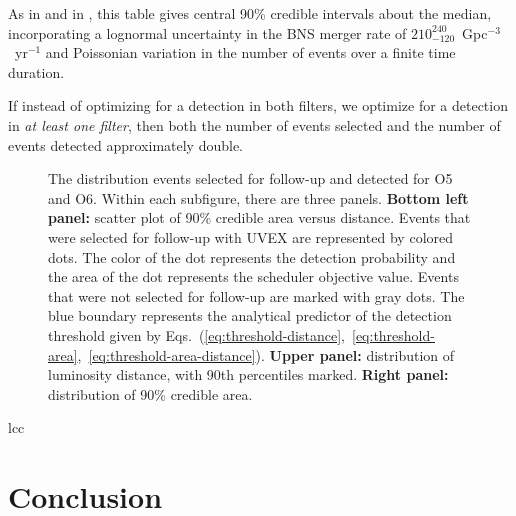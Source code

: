 \documentclass[twocolumn,times]{aastex631}
\begin{document}
As in \citet{2022ApJ...924...54P} and in \citet{2023ApJ...958..158K}, this table gives central 90\% credible intervals about the median, incorporating a lognormal uncertainty in the \ac{BNS} merger rate of $210_{-120}^{240}$~Gpc$^{-3}$~yr$^{-1}$ and Poissonian variation in the number of events over a finite time duration.

If instead of optimizing for a detection in both filters, we optimize for a detection in \emph{at least one filter}, then both the number of events selected and the number of events detected approximately double.

\begin{figure}
    \centering
    \caption{\label{fig:area-distance}The distribution events selected for follow-up and detected for O5 and O6. Within each subfigure, there are three panels. \textbf{Bottom left panel:} scatter plot of 90\% credible area versus distance. Events that were selected for follow-up with \ac{UVEX} are represented by colored dots. The color of the dot represents the detection probability and the area of the dot represents the scheduler objective value. Events that were not selected for follow-up are marked with gray dots. The blue boundary represents the analytical predictor of the detection threshold given by Eqs.~(\ref{eq:threshold-distance},~\ref{eq:threshold-area},~\ref{eq:threshold-area-distance}). \textbf{Upper panel:} distribution of luminosity distance, with 90th percentiles marked. \textbf{Right panel:} distribution of 90\% credible area.}
\end{figure}

\begin{deluxetable}{lcc}
    \startdata
    
    \enddata
\end{deluxetable}

\section{Conclusion}
\end{document}
